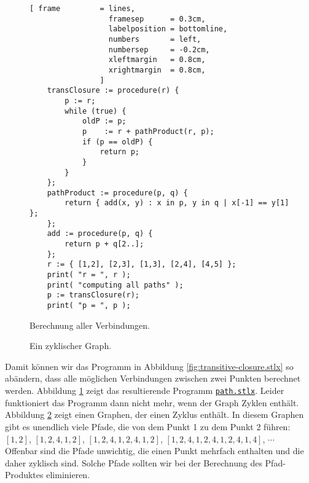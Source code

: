 \begin{figure}[!ht]
  \centering
\begin{Verbatim}[ frame         = lines, 
                  framesep      = 0.3cm, 
                  labelposition = bottomline,
                  numbers       = left,
                  numbersep     = -0.2cm,
                  xleftmargin   = 0.8cm,
                  xrightmargin  = 0.8cm,
                ]
    transClosure := procedure(r) {
        p := r;
        while (true) {
            oldP := p;
            p    := r + pathProduct(r, p);
            if (p == oldP) {
                return p;
            }
        }
    };
    pathProduct := procedure(p, q) {
        return { add(x, y) : x in p, y in q | x[-1] == y[1] };
    };    
    add := procedure(p, q) {
        return p + q[2..];
    };    
    r := { [1,2], [2,3], [1,3], [2,4], [4,5] };
    print( "r = ", r );
    print( "computing all paths" );
    p := transClosure(r);
    print( "p = ", p );
\end{Verbatim} 
\vspace*{-0.3cm}
\caption{Berechnung aller Verbindungen.}  \label{path.stlx}
\end{figure} %

\begin{figure}[!ht]
  \centering
  \vspace*{-9cm}

  \vspace*{-1cm}

  \caption{Ein zyklischer Graph.}
  \label{fig:graph-zykl}
\end{figure}

Damit können wir das Programm in Abbildung
\ref{fig:transitive-closure.stlx} so abändern, dass alle möglichen Verbindungen zwischen zwei
Punkten berechnet werden.  Abbildung
\ref{path.stlx} zeigt das resultierende Programm
\href{https://github.com/karlstroetmann/Logik/blob/master/SetlX/path.stlx}{\texttt{path.stlx}}. 
Leider funktioniert das Programm dann nicht mehr, wenn der Graph Zyklen enthält.
Abbildung
\ref{fig:graph-zykl} zeigt einen Graphen, der einen Zyklus enthält.  In diesem Graphen
gibt es unendlich viele Pfade, die von dem Punkt 1 zu dem Punkt 2 führen: \\[0.2cm]
\hspace*{1.3cm} $[ 1, 2 ]$, $[ 1, 2, 4, 1, 2 ]$, 
$[ 1, 2, 4, 1, 2, 4, 1, 2 ]$, 
$[ 1, 2, 4, 1, 2, 4, 1, 2, 4, 1, 4 ]$, $\cdots$
\\[0.2cm]
Offenbar  sind die Pfade unwichtig, die einen Punkt mehrfach enthalten und die daher
zyklisch sind.  Solche Pfade sollten wir bei der Berechnung des Pfad-Produktes
eliminieren.

